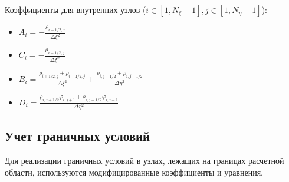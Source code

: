	Коэффициенты для внутренних узлов ($i \in [1, N_\xi-1], j \in [1, N_\eta-1]$):
	\begin{itemize}
		\item $A_i = \displaystyle -\frac{\rho_{i-1/2,j}}{\Delta \xi^2}$
		\item $C_i = \displaystyle -\frac{\rho_{i+1/2,j}}{\Delta \xi^2}$
		\item $B_i = \displaystyle \frac{\rho_{i+1/2,j} + \rho_{i-1/2,j}}{\Delta \xi^2} + \frac{\rho_{i,j+1/2} + \rho_{i,j-1/2}}{\Delta \eta^2}$
		\item $D_i = \displaystyle \frac{\rho_{i,j+1/2} \varphi_{i,j+1} + \rho_{i,j-1/2} \varphi_{i,j-1}}{\Delta \eta^2}$
	\end{itemize}
	
	\subsection{Учет граничных условий}
	
	Для реализации граничных условий в узлах, лежащих на границах расчетной области, используются модифицированные коэффициенты и уравнения.
	

